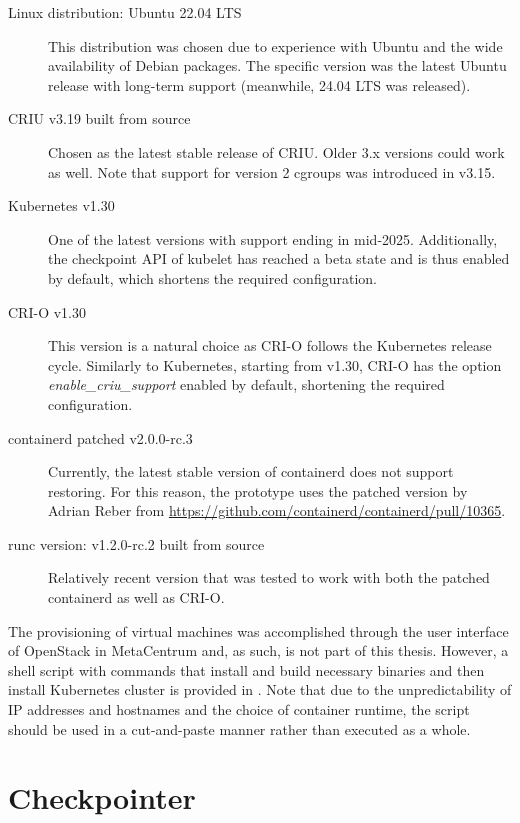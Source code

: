 \documentclass[
  digital,     %
  oneside,     %
  nosansbold,  %
  nocolorbold, %
  lof,         %
  nolot,         %
]{fithesis4}
\begin{document}
\begin{description}
    \item[Linux distribution: Ubuntu 22.04 LTS] This distribution was chosen due to experience with Ubuntu and the wide availability of Debian packages. The specific version was the latest Ubuntu release with long-term support (meanwhile, 24.04 LTS was released).
    
    \item[CRIU v3.19 built from source] Chosen as the latest stable release of CRIU. Older 3.x versions could work as well. Note that support for version 2 cgroups was introduced in v3.15.
    
    \item[Kubernetes v1.30] One of the latest versions with support ending in mid-2025. Additionally, the checkpoint API of kubelet has reached a beta state and is thus enabled by default, which shortens the required configuration.

    \item[CRI-O v1.30] This version is a natural choice as CRI-O follows the Kubernetes release cycle. Similarly to Kubernetes, starting from v1.30, CRI-O has the option \emph{enable\_criu\_support} enabled by default, shortening the required configuration.
        
    \item[containerd patched v2.0.0-rc.3] Currently, the latest stable version of containerd does not support restoring. For this reason, the prototype uses the patched version by Adrian Reber from \url{https://github.com/containerd/containerd/pull/10365}.

    \item[runc version: v1.2.0-rc.2 built from source] Relatively recent version that was tested to work with both the patched containerd as well as CRI-O. %

\end{description}

The provisioning of virtual machines was accomplished through the user interface of OpenStack in MetaCentrum and, as such, is not part of this thesis. However, a shell script with commands that install and build necessary binaries and then install Kubernetes cluster is provided in . Note that due to the unpredictability of IP addresses and hostnames and the choice of container runtime, the script should be used in a cut-and-paste manner rather than executed as a whole.


\chapter{Checkpointer}
\label{chap:checkpointer}
\end{document}
